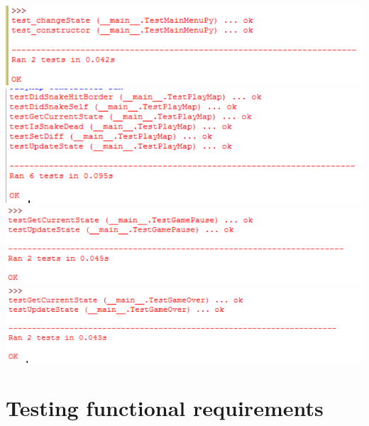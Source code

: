 \documentclass[12pt]{article}
\begin{document}
\includegraphics{testMainMenuResults}\newline\newline
\includegraphics{testPlayMapResults}\newline\newline
\includegraphics{testGamePauseResults}\newline\newline
\includegraphics{testGameOverResults}\newline\newline

\section{Testing functional requirements}
\end{document}
